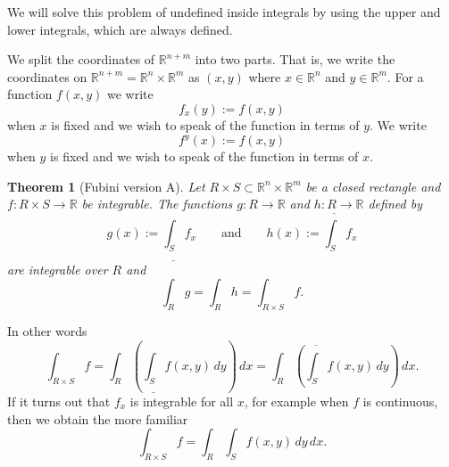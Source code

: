 \documentclass[12pt]{book}
\newcommand{\R}{{\mathbb{R}}}
\theoremstyle{plain}
\newtheorem{thm}{Theorem}[section]
\theoremstyle{remark}
\theoremstyle{definition}
\theoremstyle{exercise}
\theoremstyle{example}
\begin{document}
We will solve this problem of undefined inside integrals
by using the upper and lower integrals, which are always defined.

\medskip

We split the coordinates of $\R^{n+m}$ into two parts.  That is,
we write the coordinates on $\R^{n+m} = \R^n \times \R^m$ as
$(x,y)$ where $x \in \R^n$ and $y \in \R^m$.  For a function $f(x,y)$
we write
\begin{equation*}
f_x(y) := f(x,y)
\end{equation*}
when $x$ is fixed and we wish to speak of the function in terms of $y$.
We write
\begin{equation*}
f^y(x) := f(x,y)
\end{equation*}
when $y$ is fixed and we wish to speak of the function in terms of $x$.

\begin{thm}[Fubini version A] \label{mv:fubinivA}
Let $R \times S \subset \R^n \times \R^m$ be a closed rectangle and
$f \colon R \times S \to \R$ be integrable.
The functions $g \colon R \to \R$ and $h \colon R \to \R$ defined by
\begin{equation*}
g(x) := \underline{\int_S} f_x \qquad
\text{and} \qquad
h(x) := \overline{\int_S} f_x 
\end{equation*}
are integrable over $R$ and
\begin{equation*}
\int_R g = \int_R h = \int_{R \times S} f .
\end{equation*}
\end{thm}

In other words
\begin{equation*}
\int_{R \times S} f
=
 \int_R \left(
 \underline{\int_S} f(x,y) \, dy
\right) \, dx
=
 \int_R \left(
 \overline{\int_S} f(x,y) \, dy
\right) \, dx .
\end{equation*}
If it turns out that $f_x$ is integrable for all $x$, for example when
$f$ is continuous, then we obtain the more familiar
\begin{equation*}
\int_{R \times S} f
=
 \int_R \int_S f(x,y) \, dy \, dx .
\end{equation*}
\end{document}
